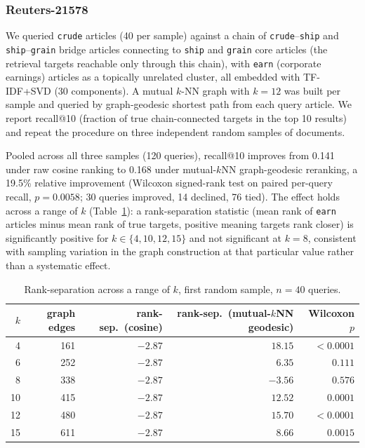 \documentclass[11pt]{article}
\begin{document}
\subsubsection{Reuters-21578}

We queried \texttt{crude} articles (40 per sample) against a chain of \texttt{crude}--\texttt{ship} and \texttt{ship}--\texttt{grain} bridge articles connecting to \texttt{ship} and \texttt{grain} core articles (the retrieval targets reachable only through this chain), with \texttt{earn} (corporate earnings) articles as a topically unrelated cluster, all embedded with TF-IDF+SVD (30 components). A mutual $k$-NN graph with $k=12$ was built per sample and queried by graph-geodesic shortest path from each query article. We report recall@10 (fraction of true chain-connected targets in the top 10 results) and repeat the procedure on three independent random samples of documents.

Pooled across all three samples (120 queries), recall@10 improves from 0.141 under raw cosine ranking to 0.168 under mutual-$k$NN graph-geodesic reranking, a 19.5\% relative improvement (Wilcoxon signed-rank test on paired per-query recall, $p=0.0058$; 30 queries improved, 14 declined, 76 tied). The effect holds across a range of $k$ (Table~\ref{tab:ksweep}): a rank-separation statistic (mean rank of \texttt{earn} articles minus mean rank of true targets, positive meaning targets rank closer) is significantly positive for $k \in \{4,10,12,15\}$ and not significant at $k=8$, consistent with sampling variation in the graph construction at that particular value rather than a systematic effect.

\begin{table}[h]
\centering
\small
\begin{tabular}{rrrrr}
\toprule
$k$ & graph edges & rank-sep.\ (cosine) & rank-sep.\ (mutual-$k$NN geodesic) & Wilcoxon $p$ \\
\midrule
4  & 161 & $-2.87$ & $18.15$ & $<0.0001$ \\
6  & 252 & $-2.87$ & $6.35$  & $0.111$ \\
8  & 338 & $-2.87$ & $-3.56$ & $0.576$ \\
10 & 415 & $-2.87$ & $12.52$ & $0.0001$ \\
12 & 480 & $-2.87$ & $15.70$ & $<0.0001$ \\
15 & 611 & $-2.87$ & $8.66$  & $0.0015$ \\
\bottomrule
\end{tabular}
\caption{Rank-separation across a range of $k$, first random sample, $n=40$ queries.}
\label{tab:ksweep}
\end{table}
\end{document}
